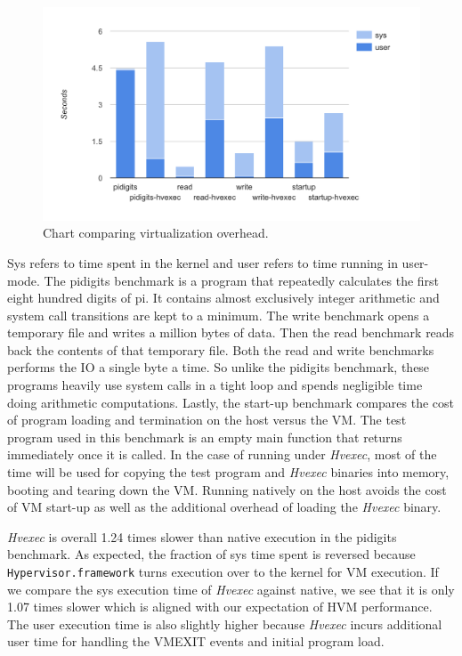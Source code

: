 \documentclass{article}
\newcommand{\PROJNAME}{\textit{Hvexec}}
\begin{document}
\begin{figure}[ht]
    \includegraphics[width=16cm]{overhead}
    \caption{Chart comparing virtualization overhead.}
    \centering
\end{figure}

Sys refers to time spent in the kernel and user refers to time running in user-mode.
The pidigits benchmark is a program that repeatedly calculates the first eight hundred digits of pi.
It contains almost exclusively integer arithmetic and system call transitions are kept to a minimum.
The write benchmark opens a temporary file and writes a million bytes of data. Then the read benchmark reads back the contents of that temporary file.
Both the read and write benchmarks performs the IO a single byte a time.
So unlike the pidigits benchmark, these programs heavily use system calls in a tight loop and spends negligible time doing arithmetic computations.
Lastly, the start-up benchmark compares the cost of program loading and termination on the host versus the VM.
The test program used in this benchmark is an empty main function that returns immediately once it is called.
In the case of running under \PROJNAME{}, most of the time will be used for copying the test program and \PROJNAME{} binaries into memory, booting and tearing down the VM.
Running natively on the host avoids the cost of VM start-up as well as the additional overhead of loading the \PROJNAME{} binary.

\PROJNAME{} is overall 1.24 times slower than native execution in the pidigits benchmark.
As expected, the fraction of sys time spent is reversed because \texttt{Hypervisor.framework} turns execution over to the kernel for VM execution.
If we compare the sys execution time of \PROJNAME{} against native, we see that it is only 1.07 times slower which is aligned with our expectation of HVM performance.
The user execution time is also slightly higher because \PROJNAME{} incurs additional user time for handling the VMEXIT events and initial program load.
\end{document}
